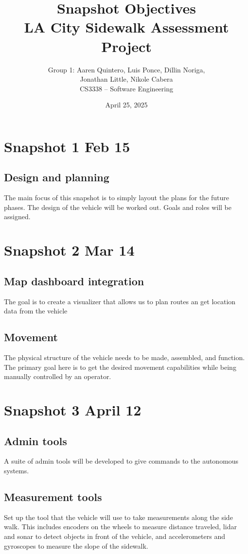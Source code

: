 \documentclass[12pt]{article}
\title{Snapshot Objectives \\
\large LA City Sidewalk Assessment Project}
\author{Group 1: Aaren Quintero, Luis Ponce, Dillin Noriga, \\
Jonathan Little, Nikole Cabera \\
CS3338 – Software Engineering}
\date{April 25, 2025}
\begin{document}
\maketitle

\section{Snapshot 1  Feb 15}
\subsection{Design and planning}
The main focus of this snapshot is to simply layout the plans for the future phases. The design of the vehicle will be worked out. Goals and roles will be assigned. 


\section{Snapshot 2 Mar 14}
\subsection{Map dashboard integration}
The goal is to create a visualizer that allows us to plan routes an get location data from the vehicle
\subsection{Movement}
The physical structure of the vehicle needs to be made, assembled, and function. The primary goal here is to get the desired movement capabilities while being manually controlled by an operator. 

\section{Snapshot 3 April 12}
\subsection{Admin tools}
A suite of admin tools will be developed to give commands to the autonomous systems.
\subsection{Measurement tools}
Set up the tool that the vehicle will use to take measurements along the side walk. This includes encoders on the wheels to measure distance traveled, lidar and sonar to detect objects in front of the vehicle, and accelerometers and gyroscopes to measure the slope of the sidewalk. 
\end{document}
